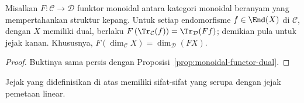 \begin{proposition}
	Misalkan $F:\mathcal{C}\to\mathcal{D}$ funktor monoidal antara kategori
	monoidal beranyam yang mempertahankan struktur kepang. Untuk setiap
	endomorfisme $f\in\End(X)$ di $\mathcal{C}$, dengan $X$ memiliki dual,
	berlaku
$F\left(\Tr_{\mathcal{C}}(f)\right)=\Tr_{\mathcal{D}}(Ff)$; demikian pula
untuk jejak kanan. Khususnya,
$F\left(\dim_{\mathcal{C}}X\right)=\dim_{\mathcal{D}}(FX)$.
\end{proposition}
\begin{proof}
	Buktinya sama persis dengan Proposisi~\ref{prop:monoidal-functor-dual}.
\end{proof}

Jejak yang didefinisikan di atas memiliki sifat-sifat yang serupa dengan
jejak pemetaan linear.

